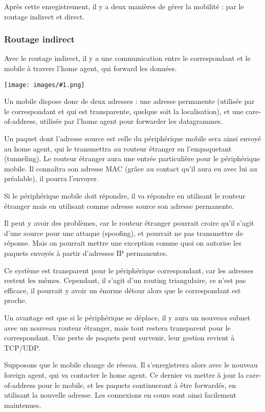 \documentclass[10pt,a4paper]{report}
\newcommand{\dessin}[1]{\begin{center}\texttt{[image: images/\#1.png]}\end{center}}
\begin{document}
	Après cette enregistrement, il y a deux manières de gérer la mobilité : par le routage indirect et direct.
  
  		\subsubsection{Routage indirect}
		Avec le routage indirect, il y a une communication entre le correspondant et le mobile à travers l'home agent, qui forward les données.
	
		\dessin{53}
		
		Un mobile dispose donc de deux adresses : une adresse permanente (utilisée par le correspondant et qui est transparente, quelque soit la localisation), et une care-of-address, utilisée par l'home agent pour forwarder les datagrammes.
  
		Un paquet dont l'adresse source est celle du périphérique mobile sera ainsi envoyé au home agent, qui le transmettra au routeur étranger en l'empaquetant (tunneling). Le routeur étranger aura une entrée particulière pour le périphérique mobile. Il connaîtra son adresse MAC (grâce au contact qu'il aura eu avec lui au préalable), il pourra l'envoyer.
  
		Si le périphérique mobile doit répondre, il va répondre en utilisant le routeur étranger mais en utilisant comme adresse source son adresse permanente. 
	
		Il peut y avoir des problèmes, car le routeur étranger pourrait croire qu'il s'agit d'une source pour une attaque (spoofing), et pourrait ne pas transmettre de réponse. Mais on pourrait mettre une exception comme quoi on autorise les paquets envoyés à partir d'adresses IP permanentes.
  
		Ce système est transparent pour le périphérique correspondant, car les adresses restent les mêmes. Cependant, il s'agit d'un routing triangulaire, ce n'est pas efficace, il pourrait y avoir un énorme détour alors que le correspondant est proche.
  
		Un avantage est que si le périphérique se déplace, il y aura un nouveau subnet avec un nouveau routeur étranger, mais tout restera transparent pour le correspondant. Une perte de paquets peut survenir, leur gestion revient à TCP/UDP.
		
		Supposons que le mobile change de réseau. Il s'enregistrera alors avec le nouveau foreign agent, qui va contacter le home agent. Ce dernier va mettre à jour la care-of-address pour le mobile, et les paquets continueront à être forwardés, en utilisant la nouvelle adresse. Les connexions en cours sont ainsi facilement maintenues.
	
\end{document}
